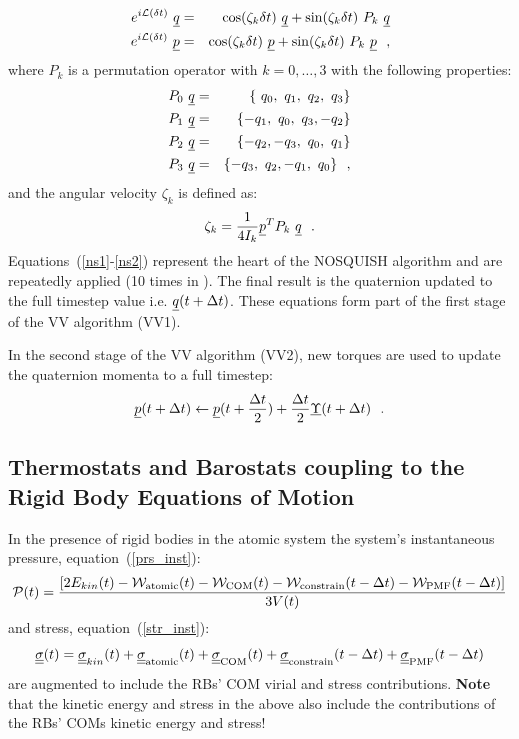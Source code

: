 \begin{eqnarray}
e^{i{\cal L} (\delta t)}~\mbox{$\underline{q}$}&=&\cos(\zeta_{k} \delta t)~\mbox{$\underline{q}$}+\sin(\zeta_{k} \delta t)~P_{k}~\mbox{$\underline{q}$} \nonumber \\
e^{i{\cal L} (\delta t)}~\mbox{$\underline{p}$}&=&\cos(\zeta_{k} \delta t)~\mbox{$\underline{p}$}+\sin(\zeta_{k} \delta t)~P_{k}~\mbox{$\underline{p}$}~~,
\end{eqnarray}
where $P_{k}$ is a permutation operator with $k=0,\ldots,3$ with the following properties:
\begin{eqnarray}
P_0~\mbox{$\underline{q}$}&=&\{~q_0,~q_1,~q_2,~q_3\} \nonumber \\
P_1~\mbox{$\underline{q}$}&=&\{-q_1,~q_0,~q_3,-q_2\} \label{ns2} \\
P_2~\mbox{$\underline{q}$}&=&\{-q_2,-q_3,~q_0,~q_1\} \nonumber \\
P_3~\mbox{$\underline{q}$}&=&\{-q_3,~q_2,-q_1,~q_0\}~~, \nonumber
\end{eqnarray}
and the angular velocity $\zeta_{k}$ is defined as:
\begin{equation}
\zeta_{k}={1 \over 4 I_{k}}\mbox{$\underline{p}$}^{T} P_{k}~\mbox{$\underline{q}$}~~.
\end{equation}
Equations~(\ref{ns1}-\ref{ns2}) represent the heart of the NOSQUISH algorithm
and are repeatedly applied (10 times in \D).  The final result is the quaternion
updated to the full timestep value i.e. $\mbox{$\underline{q}$}(t+\Delta t)$.  These equations
form part of the first stage of the VV algorithm (VV1).

In the second stage of the VV algorithm (VV2), new torques are used to update the
quaternion momenta to a full timestep:
\begin{equation}
\mbox{$\underline{p}$}(t+\Delta t) \leftarrow \mbox{$\underline{p}$}(t+{\Delta t \over 2})+{\Delta t \over 2} \mbox{$\underline{\Upsilon}$}(t+\Delta t)~~.
\end{equation}

\subsection{Thermostats and Barostats coupling to the Rigid Body Equations of Motion}

In the presence of rigid bodies in the atomic system the system's instantaneous pressure,
equation~(\ref{prs_inst}):
\begin{equation}
{\cal P}(t) = \frac{\left[ 2 E_{kin}(t) -
{\cal W}_{\rm atomic}(t) - {\cal W}_{\rm COM}(t) -
{\cal W}_{\rm constrain}(t - \Delta t) -
{\cal W}_{\rm PMF}(t - \Delta t) \right]} {3 V(t)}
\end{equation}
and stress, equation~(\ref{str_inst}):
\begin{equation}
\mbox{$\underline{\underline{\bf \sigma}}$}(t) = \mbox{$\underline{\underline{\bf \sigma}}$}_{kin}(t) +
\mbox{$\underline{\underline{\bf \sigma}}$}_{\rm atomic}(t) + \mbox{$\underline{\underline{\bf \sigma}}$}_{\rm COM}(t) +
\mbox{$\underline{\underline{\bf \sigma}}$}_{\rm constrain}(t - \Delta t) + \mbox{$\underline{\underline{\bf \sigma}}$}_{\rm PMF}(t - \Delta t)
\end{equation}
are augmented to include the RBs' COM virial and stress contributions.  {\bf Note} that
the kinetic energy and stress in the above also include the contributions of the
RBs' COMs kinetic energy and stress!

